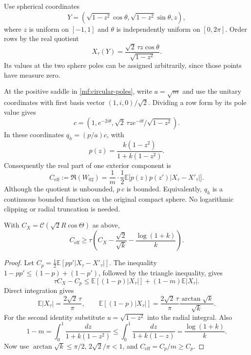 Use spherical coordinates
\[
 Y=(\sqrt{1-z^2}\cos\theta,\sqrt{1-z^2}\sin\theta,z),
\]
where \(z\) is uniform on \([-1,1]\) and \(\theta\) is independently
uniform on \([0,2\pi]\). Order rows by the real quotient
\begin{equation}\label{mf:sort-coordinate}
 X_\tau(Y)=\frac{\sqrt2\,\tau z\cos\theta}{\sqrt{1-z^2}}.
\end{equation}
Its values at the two sphere poles can be assigned arbitrarily, since
those points have measure zero.

At the positive saddle in \eqref{mf:circular-poles}, write \(a=\sqrt m\)
and use the unitary coordinates with first basis vector
\((1,i,0)/\sqrt2\). Dividing a row form by its pole value gives
\[
 c=(1,e^{-2i\theta},
          \sqrt2\,\tau z e^{-i\theta}/\sqrt{1-z^2}).
\]
In these coordinates \(q_h=(p/a)c\), with
\[
 p(z)=\frac{k(1-z^2)}{1+k(1-z^2)}.
\]
Consequently the real part of one exterior component is
\begin{equation}\label{mf:effective-gini}
 C_{\mathrm{eff}}:=\Re(W_{02})
 =\frac1m\cdot\frac12
      \mathbb E\bigl[p(z)p(z')|X_\tau-X'_\tau|\bigr].
\end{equation}
Although the quotient is unbounded, \(p\,c\) is bounded. Equivalently,
\(q_h\) is a continuous bounded function on the original compact sphere.
No logarithmic clipping or radial truncation is needed.

\begin{lemma}\label{mf:gini-loss}
With \(C_X=\mathcal C(\sqrt2R\cos\Theta)\) as above,
\begin{equation}\label{mf:gini-loss-bound}
 C_{\mathrm{eff}}\ge
 \tau\left(C_X-\frac{\sqrt2}{\sqrt k}
                   -\frac{\log(1+k)}k\right).
\end{equation}
\end{lemma}
\begin{proof}
Let \(C_p=\tfrac12\mathbb E[pp'|X_\tau-X'_\tau|]\).
The inequality \(1-pp'\le(1-p)+(1-p')\), followed by the triangle
inequality, gives
\[
 \tau C_X-C_p\le
 \mathbb E[(1-p)|X_\tau|]+(1-m)\mathbb E|X_\tau|.
\]
Direct integration gives
\[
 \mathbb E|X_\tau|=\frac{2\sqrt2\,\tau}{\pi},\qquad
 \mathbb E[(1-p)|X_\tau|]
 =\frac{2\sqrt2\,\tau}{\pi}
                  \frac{\arctan\sqrt k}{\sqrt k}.
\]
For the second identity substitute \(u=\sqrt{1-z^2}\) into the
radial integral. Also
\[
 1-m=\int_0^1\frac{dz}{1+k(1-z^2)}
 \le\int_0^1\frac{dz}{1+k(1-z)}
 =\frac{\log(1+k)}k.
\]
Now use \(\arctan\sqrt k\le\pi/2\),
\(2\sqrt2/\pi<1\), and \(C_{\mathrm{eff}}=C_p/m\ge C_p\).
\end{proof}

